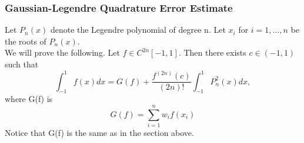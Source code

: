 \documentclass[12pt]{article}
\begin{document}
\subsubsection*{Gaussian-Legendre Quadrature Error Estimate}

Let $P_n(x)$ denote the Legendre polynomial of degree n. Let $x_i$ for $i = 1,\dots,n$ be the roots of $P_n(x)$. \\
We will prove the following.
Let $f \in C^{2n}[-1,1]$. Then there exists $c \in (-1,1)$ such that
\begin{equation}
    \int_{-1}^{1} f(x)dx = G(f) + \frac{f^{(2n)}(c)}{(2n)!}\int_{-1}^{1} P_n^2(x)dx,
\end{equation}
where G(f) is
\begin{equation}
    G(f) = \sum_{i=1}^n w_i f(x_i)
\end{equation}
Notice that G(f) is the same as in the section above.
\end{document}
